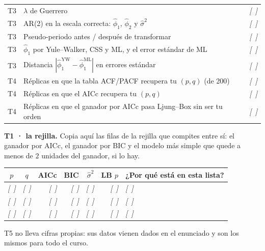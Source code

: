 \documentclass[11pt,a4paper,oneside]{article}
\newcommand{\marcador}[1]{\textcolor{grismarcador}{\textit{[#1]}}}
\begin{document}
\begin{tabularx}{\textwidth}{@{}l X r@{}}
T3 & $\lambda$ de Guerrero                                                     & \marcador{~} \\
T3 & AR(2) en la escala correcta: $\hat\phi_1$, $\hat\phi_2$ y $\hat\sigma^2$  & \marcador{~} \\
T3 & Pseudo-periodo antes / después de transformar                             & \marcador{~} \\
T3 & $\hat\phi_1$ por Yule–Walker, CSS y ML, y el error estándar de ML         & \marcador{~} \\
T3 & Distancia $|\hat\phi_1^{\mathrm{YW}} - \hat\phi_1^{\mathrm{ML}}|$ en errores estándar & \marcador{~} \\
\midrule
T4 & Réplicas en que la tabla ACF/PACF recupera tu $(p,q)$ (de 200)            & \marcador{~} \\
T4 & Réplicas en que el AICc recupera tu $(p,q)$                               & \marcador{~} \\
T4 & Réplicas en que el ganador por AICc pasa Ljung–Box sin ser tu orden       & \marcador{~} \\
\bottomrule
\end{tabularx}
\endgroup

\vspace{0.45cm}
\noindent\textbf{T1 · la rejilla.} Copia aquí las filas de la rejilla que compites entre sí: el ganador por
AICc, el ganador por BIC y el modelo más simple que quede a menos de 2 unidades del ganador, si lo hay.

\vspace{0.25cm}
\begingroup\setlength{\parskip}{0pt}
\begin{tabularx}{\textwidth}{@{}c c r r r r X@{}}
\toprule
\textbf{$p$} & \textbf{$q$} & \textbf{AICc} & \textbf{BIC} & \textbf{$\hat\sigma^2$} & \textbf{LB $p$} & \textbf{¿Por qué está en esta lista?} \\
\midrule
\marcador{~} & \marcador{~} & \marcador{~} & \marcador{~} & \marcador{~} & \marcador{~} & \marcador{~} \\
\marcador{~} & \marcador{~} & \marcador{~} & \marcador{~} & \marcador{~} & \marcador{~} & \marcador{~} \\
\marcador{~} & \marcador{~} & \marcador{~} & \marcador{~} & \marcador{~} & \marcador{~} & \marcador{~} \\
\bottomrule
\end{tabularx}
\endgroup

\vspace{0.2cm}
{\small\color{grismarcador} T5 no lleva cifras propias: sus datos vienen dados en el enunciado y son
los mismos para todo el curso.}
\end{document}

